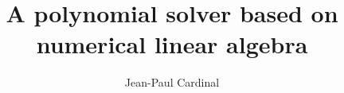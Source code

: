 \documentclass{article}
\theoremstyle{plain}%
\theoremstyle{definition}
\theoremstyle{remark}
\begin{document}

\title{A polynomial solver based on numerical linear algebra}
\author{Jean-Paul Cardinal}

\maketitle

% 







\end{document}
